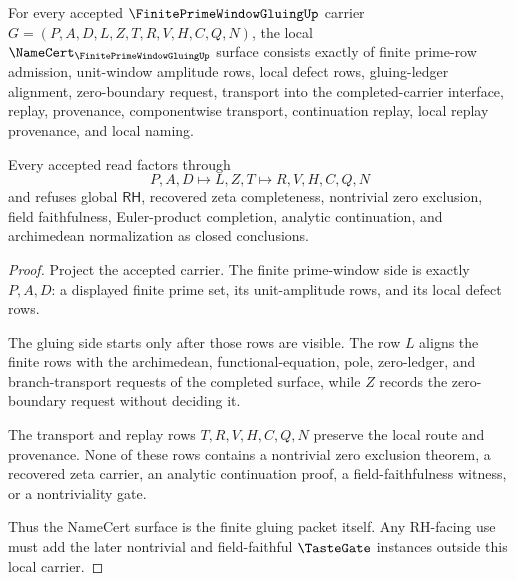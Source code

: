 \begin{theorem}
\label{thm:finite-prime-window-gluing-namecert-obligations}
For every accepted $\FinitePrimeWindowGluingUp$ carrier $G=(P,A,D,L,Z,T,R,V,H,C,Q,N)$, the local $\NameCert_{\FinitePrimeWindowGluingUp}$ surface consists exactly of finite prime-row admission, unit-window amplitude rows, local defect rows, gluing-ledger alignment, zero-boundary request, transport into the completed-carrier interface, replay, provenance, componentwise transport, continuation replay, local replay provenance, and local naming.

Every accepted read factors through
$$
P,A,D \longmapsto L,Z,T \longmapsto R,V,H,C,Q,N
$$
and refuses global $\mathsf{RH}$, recovered zeta completeness, nontrivial zero exclusion, field faithfulness, Euler-product completion, analytic continuation, and archimedean normalization as closed conclusions.
\end{theorem}
\begin{proof}
Project the accepted carrier. The finite prime-window side is exactly $P,A,D$: a displayed finite prime set, its unit-amplitude rows, and its local defect rows.

The gluing side starts only after those rows are visible. The row $L$ aligns the finite rows with the archimedean, functional-equation, pole, zero-ledger, and branch-transport requests of the completed surface, while $Z$ records the zero-boundary request without deciding it.

The transport and replay rows $T,R,V,H,C,Q,N$ preserve the local route and provenance. None of these rows contains a nontrivial zero exclusion theorem, a recovered zeta carrier, an analytic continuation proof, a field-faithfulness witness, or a nontriviality gate.

Thus the NameCert surface is the finite gluing packet itself. Any RH-facing use must add the later nontrivial and field-faithful $\TasteGate$ instances outside this local carrier.
\end{proof}

